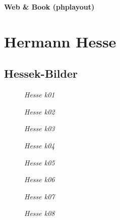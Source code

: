 \documentclass[12pt,a4paper,twosides,ngerman]{scrbook}
\begin{document}
\begin{titlepage}
\begin{center}
\large{\bfseries{Web \& Book (phplayout)}} 
\end{center}
\end{titlepage}

\chapter{Hermann Hesse}
\section{Hessek-Bilder}

\begin{figure}[htbp]
\epsfysize=3.0in
\centerline{}
\caption{\em Hesse k01}\label{fig1}
\end{figure}

\begin{figure}[htbp]
\epsfysize=3.0in
\centerline{}
\caption{\em Hesse k02}\label{fig1}
\end{figure}

\begin{figure}[htbp]
\epsfysize=3.0in
\centerline{}
\caption{\em Hesse k03}\label{fig1}
\end{figure}

\begin{figure}[htbp]
\epsfysize=3.0in
\centerline{}
\caption{\em Hesse k04}\label{fig1}
\end{figure}

\begin{figure}[htbp]
\epsfysize=3.0in
\centerline{}
\caption{\em Hesse k05}\label{fig1}
\end{figure}

\begin{figure}[htbp]
\epsfysize=3.0in
\centerline{}
\caption{\em Hesse k06}\label{fig1}
\end{figure}

\begin{figure}[htbp]
\epsfysize=3.0in
\centerline{}
\caption{\em Hesse k07}\label{fig1}
\end{figure}

\begin{figure}[htbp]
\epsfysize=3.0in
\centerline{}
\caption{\em Hesse k08}\label{fig1}
\end{figure}
\end{document}
